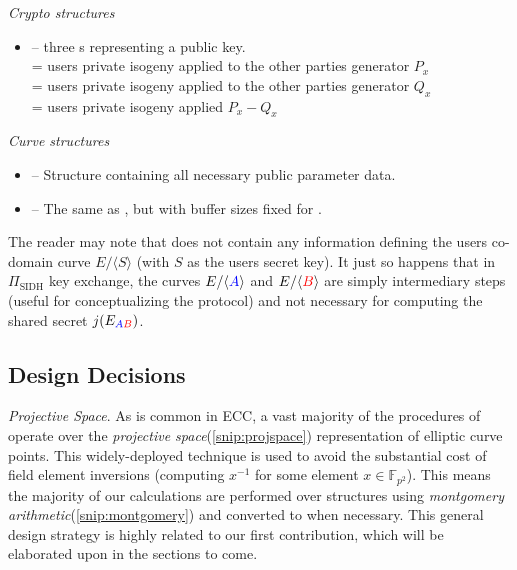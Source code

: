 \emph{Crypto structures}
\begin{itemize}
	\item {} -- three s representing a public key.\\
	 = users private isogeny applied to the other parties generator $P_x$\\
	 = users private isogeny applied to the other parties generator $Q_x$\\
	 = users private isogeny applied $P_x - Q_x$
\end{itemize}

\emph{Curve structures}
\begin{itemize}
	\item {} -- Structure containing all necessary public parameter data.
	\item {} -- The same as , but with buffer sizes fixed for .
\end{itemize}

The reader may note that  does not contain any information defining the users co-domain curve $E/\langle S \rangle$ (with $S$ as the users secret key). It just so happens that in $\Pi_{\text{SIDH}}$ key exchange, the curves $E/\langle \textcolor{blue}{A} \rangle$ and $E/\langle \textcolor{red}{B} \rangle$ are simply intermediary steps (useful for conceptualizing the protocol) and not necessary for computing the shared secret $j(E_{\textcolor{blue}{A}\textcolor{red}{B}})$.

\subsection{Design Decisions}

\noindent
\emph{Projective Space}. As is common in ECC, a vast majority of the procedures of \sidh operate over the \emph{projective space}(\ref{snip:projspace}) representation of elliptic curve points. This widely-deployed technique is used to avoid the substantial cost of field element inversions (computing $x^{-1}$ for some element $x \in \mathbb{F}_{p^2}$). This means the majority of our calculations are performed over  structures using \emph{montgomery arithmetic}(\ref{snip:montgomery}) and converted to  when necessary. This general design strategy is highly related to our first contribution, which will be elaborated upon in the sections to come.\\


